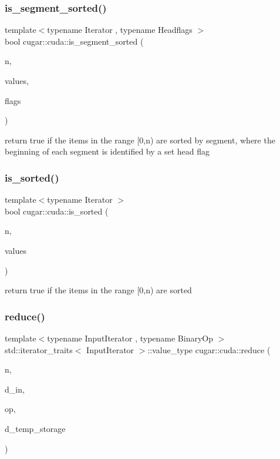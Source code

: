 \subsubsection{\texorpdfstring{is\+\_\+segment\+\_\+sorted()}{is\_segment\_sorted()}}
{\footnotesize\ttfamily template$<$typename Iterator , typename Headflags $>$ \\
bool cugar\+::cuda\+::is\+\_\+segment\+\_\+sorted (\begin{DoxyParamCaption}\item[{const uint32}]{n,  }\item[{const Iterator}]{values,  }\item[{const Headflags}]{flags }\end{DoxyParamCaption})}

return true if the items in the range \mbox{[}0,n) are sorted by segment, where the beginning of each segment is identified by a set head flag \mbox{\label{group___c_u_d_a_primitives_gad4b97d1c8070f15a448394731a4d340a}} 
\subsubsection{\texorpdfstring{is\+\_\+sorted()}{is\_sorted()}}
{\footnotesize\ttfamily template$<$typename Iterator $>$ \\
bool cugar\+::cuda\+::is\+\_\+sorted (\begin{DoxyParamCaption}\item[{const uint32}]{n,  }\item[{const Iterator}]{values }\end{DoxyParamCaption})}

return true if the items in the range \mbox{[}0,n) are sorted \mbox{\label{group___c_u_d_a_primitives_ga861c0e403d1c73c5dd9a7f211341c76d}} 
\subsubsection{\texorpdfstring{reduce()}{reduce()}}
{\footnotesize\ttfamily template$<$typename Input\+Iterator , typename Binary\+Op $>$ \\
std\+::iterator\+\_\+traits$<$ Input\+Iterator $>$\+::value\+\_\+type cugar\+::cuda\+::reduce (\begin{DoxyParamCaption}\item[{const uint32}]{n,  }\item[{Input\+Iterator}]{d\+\_\+in,  }\item[{Binary\+Op}]{op,  }\item[{thrust\+::device\+\_\+vector$<$ uint8 $>$ \&}]{d\+\_\+temp\+\_\+storage }\end{DoxyParamCaption})}

